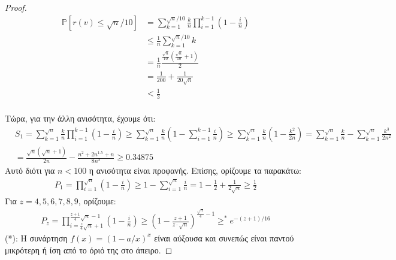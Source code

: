 \documentclass[a4paper, oneside, 11pt]{article}
\theoremstyle{definition}
\newcommand{\pr}{\mathbb{P}}
\begin{document}
\begin{enumerate}
\begin{proof}
      \begin{align*}
         \pr[r(v) \leq \sqrt{n}/10]
            &= \sum_{k=1}^{\sqrt{n}/10} \frac{k}{n} \prod_{i=1}^{k-1} \left(1 -
               \frac{i}{n} \right)\\
            &\leq \frac{1}{n} \sum_{k=1}^{\sqrt{n}/10} k\\
            &=\frac{1}{n} \frac{\frac{\sqrt{n}}{10} \left( \frac{\sqrt{n}}{10} + 1 \right)}{2}\\
            &= \frac{1}{200} + \frac{1}{20\sqrt{n}}\\
            &< \frac{1}{3}\\
      \end{align*}

Τώρα, για την άλλη ανισότητα, έχουμε ότι:
      \begin{align*}
	&S_1 = 
\sum_{k=1}^{\sqrt{n}} \frac{k}{n} \prod_{i=1}^{k-1} (1-\frac{i}{n}) \geq \sum_{k=1}^{\sqrt{n}} \frac{k}{n} (1-\sum_{i=1}^{k-1} \frac{i}{n}) \geq \sum_{k=1}^{\sqrt{n}} \frac{k}{n} (1-\frac{k^2}{2n})
	= \sum_{k=1}^{\sqrt{n}} \frac{k}{n} - \sum_{k=1}^{\sqrt{n}} \frac{k^3}{2n^2} \\
        &= \frac{\sqrt{n}(\sqrt{n}+1)}{2n} - \frac{n^2 + 2n^{1.5}+n}{8n^2} \geq 0.34875
      \end{align*}
Αυτό διότι για $n < 100$ η ανισότητα είναι προφανής.
Επίσης, ορίζουμε τα παρακάτω:
      \begin{align*}
	P_1 = \prod_{i=1}^{\sqrt{n}} (1-\frac{i}{n}) \geq 1 - \sum_{i=1}^{\sqrt{n}} \frac{i}{n} = 1 - \frac{1}{2} + \frac{1}{2\sqrt{n}} \geq \frac{1}{2}
      \end{align*}
Για $z = 4,5,6,7,8,9$, ορίζουμε:
      \begin{align*}
	P_z = \prod_{i=\frac{z}{4} \sqrt{n}+1}^{\frac{z+1}{4} \sqrt{n} - 1} (1 - \frac{i}{n}) \geq (1 - \frac{z+1}{z\cdot \sqrt{n}})^{\frac{\sqrt{n}}{4}-1} \geq^* e^{-(z+1)/16}
      \end{align*}
(*): Η συνάρτηση $f(x)=(1-a/x)^x$ είναι αύξουσα και συνεπώς είναι παντού μικρότερη ή ίση από το όριό της στο άπειρο.


\end{proof}
\end{enumerate}
\end{document}

